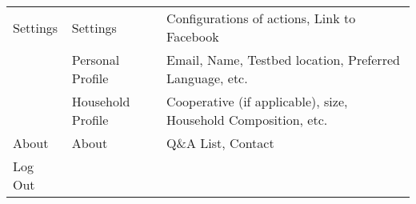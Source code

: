 \begin{longtable}{ p{3.5cm}  p{3.5cm} p{7.5cm}}
Settings & Settings & Configurations of actions, Link to Facebook \\  \cline{2-3}
& Personal Profile & Email, Name, Testbed location, Preferred Language, etc.  \\ \cline{2-3}
& Household Profile & Cooperative (if applicable), size, Household Composition, etc.\\  \hline

About & About & Q\&A List, Contact\\ \hline
Log Out &   &  \\ \hline
\end{longtable}


% 

